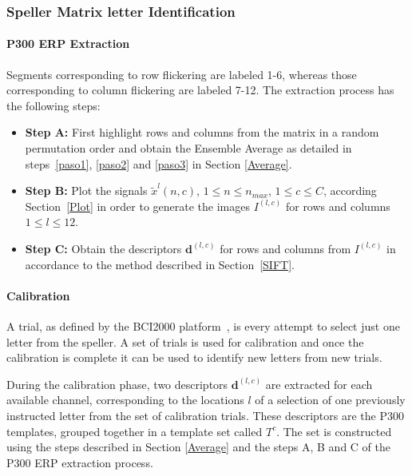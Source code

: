 \documentclass[utf8]{frontiersSCNS} %
\begin{document}
\subsubsection{Speller Matrix letter Identification}
\label{Classification}

\paragraph{P300 ERP Extraction}
Segments corresponding to row flickering are labeled 1-6, whereas those corresponding to column flickering are labeled 7-12.  The extraction process has the following steps:

\begin{itemize}

\item \textbf{Step A:}\label{pasoa} First highlight rows and columns from the matrix in a random permutation order and obtain the Ensemble Average as detailed in steps~\ref{paso1}, \ref{paso2} and \ref{paso3} in Section \ref{Average}.
\item \textbf{Step B:}\label{paso4} Plot the signals $\tilde{x}^l(n,c)$,  $1 \leq n \leq n_{max}$, $1 \leq c \leq C $,  according Section~\ref{Plot} in order to generate the images $I^{(l,c)}$ for rows and columns $1 \leq l \leq 12$.

\item \textbf{Step C:} Obtain the descriptors $ \mathbf{d}^{(l,c)}$ for rows and columns from $I^{(l,c)}$  in accordance to the method described in Section~\ref{SIFT}. 

\end{itemize}

\paragraph{Calibration}

A trial, as defined by the BCI2000 platform~\citep{Schalk2004}, is every attempt to select just one letter from the speller.  A set of trials is used for calibration and once the calibration is complete it can be used to identify new letters from new trials.

During the calibration phase, two descriptors $ \mathbf{d}^{(l,c)}$ are extracted for each available channel, corresponding to the locations $l$ of a selection of one previously instructed letter from the set of calibration trials.  These descriptors are the P300 templates, grouped together in a template set called $ T^c $.   The set is constructed using the steps described in Section \ref{Average} and the steps A, B and C of the P300 ERP extraction process.
\end{document}
